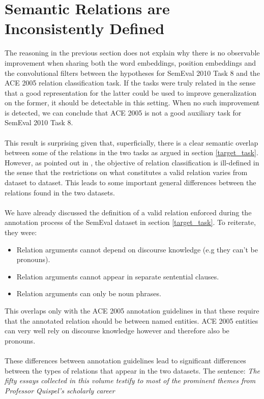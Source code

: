 \section{Semantic Relations are Inconsistently Defined}
The reasoning in the previous section does not explain why there is no observable improvement when sharing both the word embeddings, position embeddings and the convolutional filters between the hypotheses for SemEval 2010 Task 8 and the ACE 2005 relation classification task. If the tasks were truly related in the sense that a good representation for the latter could be used to improve generalization on the former, it should be detectable in this setting. When no such improvement is detected, we can conclude that ACE 2005 is not a good auxiliary task for SemEval 2010 Task 8.
\\\\
This result is surprising given that, superficially, there is a clear semantic overlap between some of the relations in the two tasks as argued in section \ref{target_task}. However, as pointed out in \citet{handschuh2016}, the objective of relation classification is ill-defined in the sense that the restrictions on what constitutes a valid relation varies from dataset to dataset. This leads to some important general differences between the relations found in the two datasets.
\\\\
We have already discussed the definition of a valid relation enforced during the annotation process of the SemEval dataset in section \ref{target_task}. To reiterate, they were:
\begin{itemize}
	\item Relation arguments cannot depend on discourse knowledge (e.g they can't be pronouns).
	\item Relation arguments cannot appear in separate sentential clauses.
	\item Relation arguments can only be noun phrases.
\end{itemize}
This overlaps only with the ACE 2005 annotation guidelines in that these require that the annotated relation should be between named entities. ACE 2005 entities can very well rely on discourse knowledge however and therefore also be pronouns.
\\\\
These differences between annotation guidelines lead to significant differences between the types of relations that appear in the two datasets. The sentence: \textit{The fifty essays collected in this volume testify to most of the prominent themes from Professor Quispel's scholarly career}
